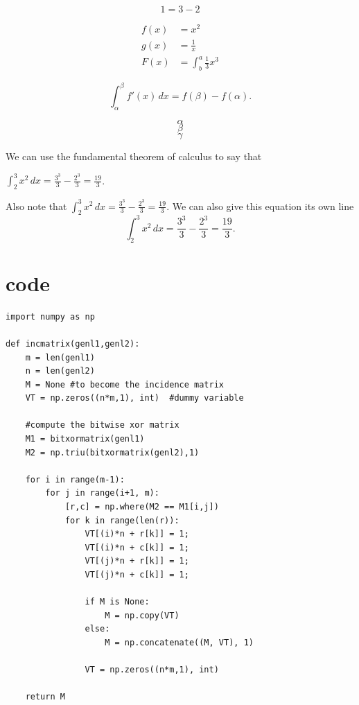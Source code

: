 \documentclass{scrreprt}
\begin{document}
\begin{equation}
  1 = 3 - 2
\end{equation}

\begin{align}
  f(x) &= x^2
    \\
  g(x) &= \frac{1}{x}
    \\
  F(x) &= \int^a_b \frac{1}{3}x^3
\end{align}

\begin{equation}
	\int_\alpha^\beta f'(x) \, dx=f(\beta)-f(\alpha).
\end{equation}

\[ \alpha \]
\[ \beta \]
\[ \gamma \]

We can use the fundamental theorem of calculus to say that

 $\int_2^3 x^2 \, dx=\frac{3^3}{3}-\frac{2^3}{3}=\frac{19}{3}$.  

Also note that $\displaystyle \int_2^3 x^2 \, dx=\frac{3^3}{3}-\frac{2^3}{3}=\frac{19}{3}$. 
 We can also give this equation its own line 
\[
	\int_2^3 x^2 \, dx=\frac{3^3}{3}-\frac{2^3}{3}=\frac{19}{3}.
\]

\section{code}
\begin{verbatim}
import numpy as np
    
def incmatrix(genl1,genl2):
    m = len(genl1)
    n = len(genl2)
    M = None #to become the incidence matrix
    VT = np.zeros((n*m,1), int)  #dummy variable
    
    #compute the bitwise xor matrix
    M1 = bitxormatrix(genl1)
    M2 = np.triu(bitxormatrix(genl2),1) 

    for i in range(m-1):
        for j in range(i+1, m):
            [r,c] = np.where(M2 == M1[i,j])
            for k in range(len(r)):
                VT[(i)*n + r[k]] = 1;
                VT[(i)*n + c[k]] = 1;
                VT[(j)*n + r[k]] = 1;
                VT[(j)*n + c[k]] = 1;
                
                if M is None:
                    M = np.copy(VT)
                else:
                    M = np.concatenate((M, VT), 1)
                
                VT = np.zeros((n*m,1), int)
    
    return M
\end{verbatim}
\end{document}
